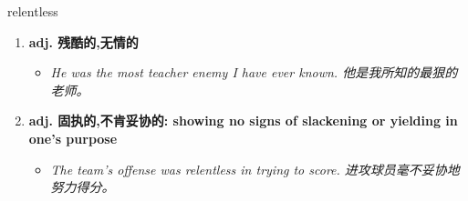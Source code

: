 
\begin{frame}
{\huge relentless}
\begin{center}
\begin{enumerate}\Large
  \item \textbf{adj. 残酷的,无情的}
  \begin{itemize}
    \item \em{\Large{He was the most teacher enemy I have ever known. 他是我所知的最狠的老师。}}
  \end{itemize}
  \item \textbf{adj. 固执的,不肯妥协的: showing no signs of slackening or yielding in one's purpose}
  \begin{itemize}
    \item \em{\Large{The team's offense was relentless in trying to score. 进攻球员毫不妥协地努力得分。}}
  \end{itemize}
\end{enumerate}
\end{center}
\end{frame}
